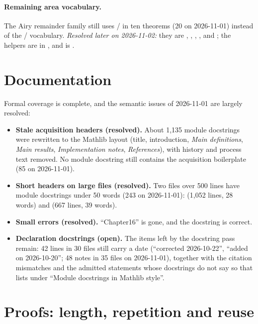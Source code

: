 \documentclass[11pt,a4paper]{article}
\newcommand{\dlmf}{\repofile{lean-DLMF}}
\begin{document}
\paragraph{Remaining area vocabulary.}
The Airy remainder family still uses / in ten theorems (20
on 2026-11-01) instead of the / vocabulary. \emph{Resolved later on
2026-11-02:} they are , , ,
,  and ; the  helpers are
in , and  is
.

\section{Documentation}

Formal coverage is complete, and the semantic issues of 2026-11-01 are largely resolved:
\begin{itemize}
  \item \textbf{Stale acquisition headers (resolved).} About 1{,}135 module docstrings were
    rewritten to the Mathlib layout (title, introduction, \emph{Main definitions},
    \emph{Main results}, \emph{Implementation notes}, \emph{References}), with history and
    process text removed. No module docstring still contains the acquisition boilerplate (85
    on 2026-11-01).
  \item \textbf{Short headers on large files (resolved).} Two files over 500 lines have module
    docstrings under 50 words (243 on 2026-11-01):
     (1{,}052 lines, 28 words) and
     (667 lines, 39 words).
  \item \textbf{Small errors (resolved).} ``Chapter16'' is gone, and the
     docstring is correct.
  \item \textbf{Declaration docstrings (open).} The items left by the docstring pass remain:
    42 lines in 30 files still carry a date (``corrected 2026-10-22'', ``added on
    2026-10-20''; 48 notes in 35 files on 2026-11-01), together with the citation mismatches
    and the admitted statements whose docstrings do not say so that \dlmf{REVIEW.md} lists
    under ``Module docstrings in Mathlib style''.
\end{itemize}

\section{Proofs: length, repetition and reuse}
\end{document}
